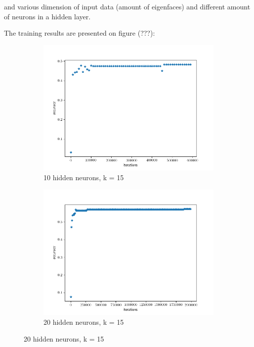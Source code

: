 and various dimension of input data (amount of eigenfaces) and different amount of neurons in a hidden layer.

The training results are presented on figure (???):

\begin{figure}[H]
\centering
\begin{subfigure}[b]{.45\linewidth}
\includegraphics[width=\linewidth]{img/tests/lwf/40ppl/PCA_MLPk20h11}
\caption{10 hidden neurons, k = 15}
\end{subfigure}
\begin{subfigure}[b]{.45\linewidth}
\includegraphics[width=\linewidth]{img/tests/lwf/40ppl/PCA_MLPk1520}
\caption{20 hidden neurons, k = 15}
\end{subfigure}



\end{figure}
